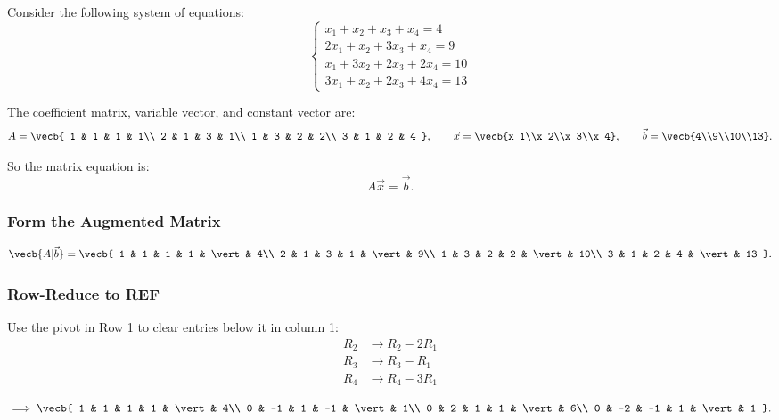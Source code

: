Consider the following system of equations:
\[
\begin{cases}
x_1 + x_2 + x_3 + x_4 = 4 \\
2x_1 + x_2 + 3x_3 + x_4 = 9 \\
x_1 + 3x_2 + 2x_3 + 2x_4 = 10 \\
3x_1 + x_2 + 2x_3 + 4x_4 = 13
\end{cases}
\]

The coefficient matrix, variable vector, and constant vector are:
\[
A=\vecb{
1 & 1 & 1 & 1\\
2 & 1 & 3 & 1\\
1 & 3 & 2 & 2\\
3 & 1 & 2 & 4
},
\qquad
\vec{x}=\vecb{x_1\\x_2\\x_3\\x_4},
\qquad
\vec{b}=\vecb{4\\9\\10\\13}.
\]

So the matrix equation is:
\[
A\vec{x}=\vec{b}.
\]

\subsubsection{Form the Augmented Matrix}

\[
\vecb{A\vert \vec{b}}
=
\vecb{
1 & 1 & 1 & 1 & \vert & 4\\
2 & 1 & 3 & 1 & \vert & 9\\
1 & 3 & 2 & 2 & \vert & 10\\
3 & 1 & 2 & 4 & \vert & 13
}.
\]

\subsubsection{Row-Reduce to REF}

Use the pivot in Row 1 to clear entries below it in column 1:
\begin{align*}
R_2 &\rightarrow R_2 - 2R_1 \\
R_3 &\rightarrow R_3 - R_1 \\
R_4 &\rightarrow R_4 - 3R_1
\end{align*}

\begin{align*}
\implies
\vecb{
1 & 1 & 1 & 1 & \vert & 4\\
0 & -1 & 1 & -1 & \vert & 1\\
0 & 2 & 1 & 1 & \vert & 6\\
0 & -2 & -1 & 1 & \vert & 1
}.
\end{align*}


